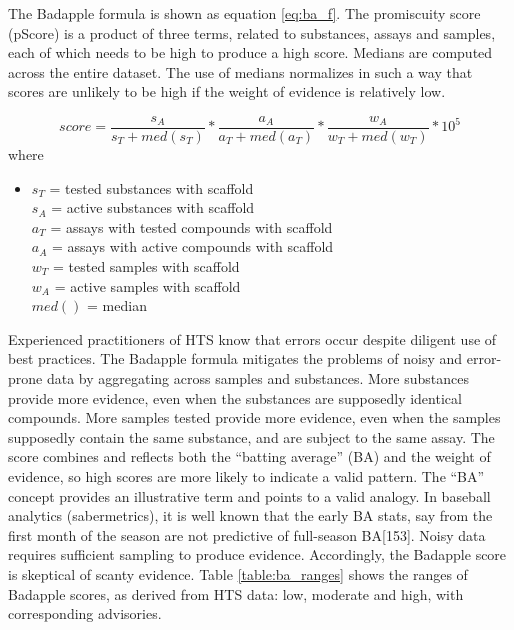 The Badapple formula is shown as equation \ref{eq:ba_f}. The promiscuity score (pScore) is a product of three terms, related to substances, assays and samples, each of which needs to be high to produce a high score. Medians are computed across the entire dataset. The use of medians normalizes in such a way that scores are unlikely to be high if the weight of evidence is relatively low.

\begin{equation}
score = \frac{s_A}{s_T + med(s_T)} * \frac{a_A}{a_T + med(a_T)} * \frac{w_A}{w_T + med(w_T)} * 10^5
\label{eq:ba_formula}
\end{equation}
where \\
\begin{itemize}
\item[] $s_T$ = tested substances with scaffold \\ 
$s_A$ = active substances with scaffold \\ 
$a_T$ = assays with tested compounds with scaffold \\
$a_A$ = assays with active compounds with scaffold \\ 
$w_T$ = tested samples with scaffold \\
$w_A$ = active samples with scaffold \\
$med()$ = median
\end{itemize}

Experienced practitioners of HTS know that errors occur despite diligent use of best practices. The Badapple formula mitigates the problems of noisy and error-prone data by aggregating across samples and substances. More substances provide more evidence, even when the substances are supposedly identical compounds. More samples tested provide more evidence, even when the samples supposedly contain the same substance, and are subject to the same assay. The score combines and reflects both the “batting average” (BA) and the weight of evidence, so high scores are more likely to indicate a valid pattern. The “BA” concept provides an illustrative term and points to a valid analogy. In baseball analytics (sabermetrics), it is well known that the early BA stats, say from the first month of the season are not predictive of full-season BA[153]. Noisy data requires sufficient sampling to produce evidence. Accordingly, the Badapple score is skeptical of scanty evidence. Table \ref{table:ba_ranges} shows the ranges of Badapple scores, as derived from HTS data: low, moderate and high, with corresponding advisories.

